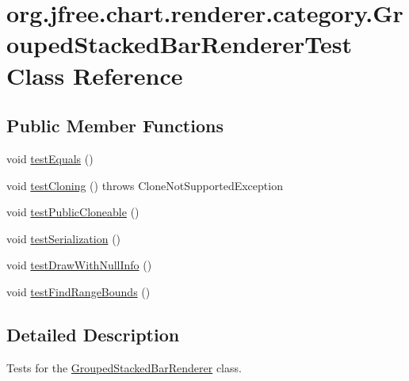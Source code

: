 \hypertarget{classorg_1_1jfree_1_1chart_1_1renderer_1_1category_1_1_grouped_stacked_bar_renderer_test}{}\section{org.\+jfree.\+chart.\+renderer.\+category.\+Grouped\+Stacked\+Bar\+Renderer\+Test Class Reference}
\label{classorg_1_1jfree_1_1chart_1_1renderer_1_1category_1_1_grouped_stacked_bar_renderer_test}
\subsection*{Public Member Functions}
\begin{DoxyCompactItemize}
\item 
void \mbox{\hyperlink{classorg_1_1jfree_1_1chart_1_1renderer_1_1category_1_1_grouped_stacked_bar_renderer_test_ab00ca569e04da3a59f5ea0f04c593795}{test\+Equals}} ()
\item 
void \mbox{\hyperlink{classorg_1_1jfree_1_1chart_1_1renderer_1_1category_1_1_grouped_stacked_bar_renderer_test_a79d3073d17b5b271b5782f41cb77fe11}{test\+Cloning}} ()  throws Clone\+Not\+Supported\+Exception 
\item 
void \mbox{\hyperlink{classorg_1_1jfree_1_1chart_1_1renderer_1_1category_1_1_grouped_stacked_bar_renderer_test_aea3b86551339e4822a27eb55417cd5c8}{test\+Public\+Cloneable}} ()
\item 
void \mbox{\hyperlink{classorg_1_1jfree_1_1chart_1_1renderer_1_1category_1_1_grouped_stacked_bar_renderer_test_a30e8fa5669dcfe82791bc37af202b122}{test\+Serialization}} ()
\item 
void \mbox{\hyperlink{classorg_1_1jfree_1_1chart_1_1renderer_1_1category_1_1_grouped_stacked_bar_renderer_test_a715ac7b24000b48fde28b0f5f2683658}{test\+Draw\+With\+Null\+Info}} ()
\item 
void \mbox{\hyperlink{classorg_1_1jfree_1_1chart_1_1renderer_1_1category_1_1_grouped_stacked_bar_renderer_test_a813078fb536251a5408dd63ce46aa3d8}{test\+Find\+Range\+Bounds}} ()
\end{DoxyCompactItemize}


\subsection{Detailed Description}
Tests for the \mbox{\hyperlink{classorg_1_1jfree_1_1chart_1_1renderer_1_1category_1_1_grouped_stacked_bar_renderer}{Grouped\+Stacked\+Bar\+Renderer}} class. 

